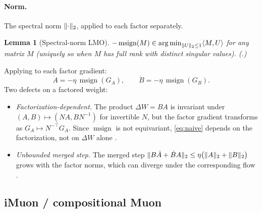 \documentclass[11pt]{article}
\DeclareMathOperator*{\argmin}{arg\,min}
\DeclarePairedDelimiter{\norm}{\lVert}{\rVert}
\newcommand{\DW}{\Delta W}
\DeclareMathOperator{\polar}{msign}          %
\theoremstyle{plain}
\newtheorem{lemma}{Lemma}
\theoremstyle{definition}
\theoremstyle{remark}
\begin{document}
\paragraph{Norm.} The spectral norm $\norm{\cdot}_2$, applied to each factor separately.
\begin{lemma}[Spectral-norm LMO]\label{lem:lmo}
$-\polar(M)\in\argmin_{\norm{U}_2\le1}\langle M,U\rangle$ for any matrix $M$ (uniquely so when $M$ has full rank with distinct singular values). \emph{(.)}
\end{lemma}
\noindent Applying  to each factor gradient:
\begin{equation}
  \dot A=-\eta\,\polar(G_A),\qquad \dot B=-\eta\,\polar(G_B).
  \label{eq:naive}
\end{equation}
Two defects on a factored weight:
\begin{itemize}[leftmargin=1.5em,itemsep=1pt,topsep=2pt]
  \item \emph{Factorization-dependent.} The product $\DW=BA$ is invariant under $(A,B)\mapsto(NA,BN^{-1})$ for invertible $N$, but the factor gradient transforms as $G_A\mapsto N^{-\top}G_A$. Since $\polar$ is not equivariant, \eqref{eq:naive} depends on the factorization, not on $\DW$ alone \cite{imuon}.
  \item \emph{Unbounded merged step.} The merged step
        $\norm{B\dot A+\dot B A}_2\le\eta\big(\norm{A}_2+\norm{B}_2\big)$
        grows with the factor norms, which can diverge under the corresponding flow \cite{kang_specgf}.
\end{itemize}

\subsection{iMuon / compositional Muon}
\label{sec:method-imuon}
\end{document}
